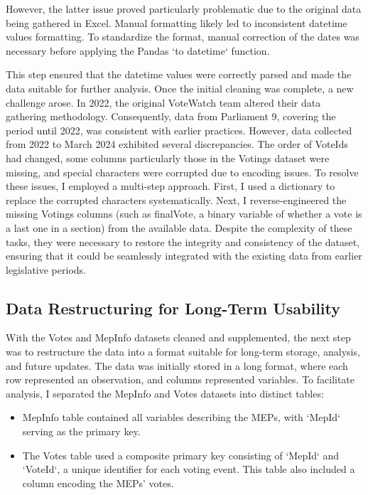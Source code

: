 \documentclass{article}
\begin{document}
However, the latter issue proved particularly problematic due to the original data being gathered in Excel. Manual formatting likely led to inconsistent datetime values formatting. To standardize the format, manual correction of the dates was necessary before applying the Pandas `to datetime` function.

This step ensured that the datetime values were correctly parsed and made the data suitable for further analysis.
Once the initial cleaning was complete, a new challenge arose. In 2022, the original VoteWatch team altered their data gathering methodology. Consequently, data from Parliament 9, covering the period until 2022, was consistent with earlier practices. However, data collected from 2022 to March 2024 exhibited several discrepancies. The order of VoteIds had changed, some columns particularly those in the Votings dataset were missing, and special characters were corrupted due to encoding issues.
To resolve these issues, I employed a multi-step approach. First, I used a dictionary to replace the corrupted characters systematically. Next, I reverse-engineered the missing Votings columns (such as finalVote, a binary variable of whether a vote is a last one in a section) from the available data. Despite the complexity of these tasks, they were necessary to restore the integrity and consistency of the dataset, ensuring that it could be seamlessly integrated with the existing data from earlier legislative periods.

\subsection{Data Restructuring for Long-Term Usability}

With the Votes and MepInfo datasets cleaned and supplemented, the next step was to restructure the data into a format suitable for long-term storage, analysis, and future updates. The data was initially stored in a long format, where each row represented an observation, and columns represented variables. To facilitate analysis, I separated the MepInfo and Votes datasets into distinct tables:
\begin{itemize}
 \item MepInfo table contained all variables describing the MEPs, with `MepId` serving as the primary key.
 \item The Votes table used a composite primary key consisting of `MepId` and `VoteId`, a unique identifier for each voting event. This table also included a column encoding the MEPs' votes.
\end{itemize}
\end{document}
